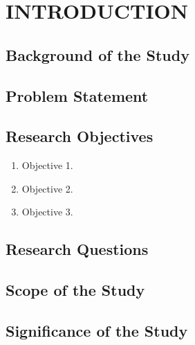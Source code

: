 
\chapter{INTRODUCTION}

\section{Background of the Study}

\section{Problem Statement}

\section{Research Objectives}
\begin{enumerate}
    \item Objective 1.
    \item Objective 2.
    \item Objective 3.
\end{enumerate}

\section{Research Questions}

\section{Scope of the Study}

\section{Significance of the Study}


